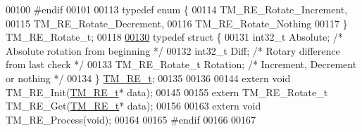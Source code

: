 \begin{DoxyCode}
00100 \textcolor{preprocessor}{#endif}
00101 
00113 \textcolor{keyword}{typedef} \textcolor{keyword}{enum} \{
00114     TM\_RE\_Rotate\_Increment,
00115     TM\_RE\_Rotate\_Decrement,
00116     TM\_RE\_Rotate\_Nothing
00117 \} TM\_RE\_Rotate\_t;
00118 
\hypertarget{tm__stm32f4__rotary__encoder_8h_source_l00130}{}\hyperlink{struct_t_m___r_e__t}{00130} \textcolor{keyword}{typedef} \textcolor{keyword}{struct }\{
00131     int32\_t Absolute;               \textcolor{comment}{/* Absolute rotation from beginning */}
00132     int32\_t Diff;                   \textcolor{comment}{/* Rotary difference from last check */}
00133     TM\_RE\_Rotate\_t Rotation;        \textcolor{comment}{/* Increment, Decrement or nothing */}
00134 \} \hyperlink{struct_t_m___r_e__t}{TM\_RE\_t};
00135 
00136 
00144 \textcolor{keyword}{extern} \textcolor{keywordtype}{void} TM\_RE\_Init(\hyperlink{struct_t_m___r_e__t}{TM\_RE\_t}* data);
00145 
00155 \textcolor{keyword}{extern} TM\_RE\_Rotate\_t TM\_RE\_Get(\hyperlink{struct_t_m___r_e__t}{TM\_RE\_t}* data);
00156 
00163 \textcolor{keyword}{extern} \textcolor{keywordtype}{void} TM\_RE\_Process(\textcolor{keywordtype}{void});
00164 
00165 \textcolor{preprocessor}{#endif}
00166 
00167 
\end{DoxyCode}
